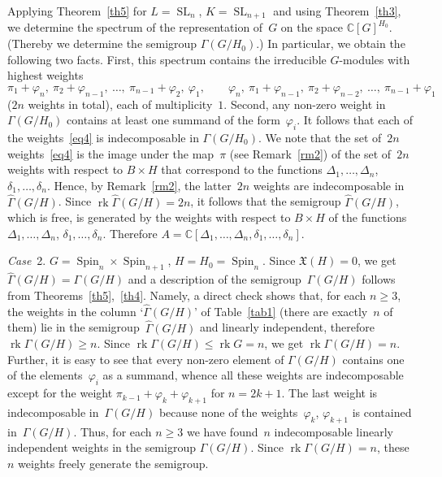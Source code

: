 \documentclass[12pt]{amsart}
\theoremstyle{definition}
\theoremstyle{remark}
\begin{document}
Applying Theorem~\ref{th5} for $L={\operatorname{SL}}_n$, $K={\operatorname{SL}}_{n+1}$ and using
Theorem~\ref{th3}, we determine the spectrum of the representation
of~$G$ on the space $\mathbb{C}[G]^{H_0}$. (Thereby we determine the
semigroup $\Gamma(G/H_0)$.) In particular, we obtain the following
two facts. First, this spectrum contains the irreducible $G$-modules
with highest weights
\begin{equation}
\label{eq4} \pi_1+\varphi_n,\ \pi_2+\varphi_{n-1},\ \dots,\
\pi_{n-1}+\varphi_2,\ \varphi_1, \qquad \varphi_n,\
\pi_1+\varphi_{n-1},\ \pi_2+\varphi_{n-2},\ \dots,\
\pi_{n-1}+\varphi_1
\end{equation}
($2n$ weights in total), each of multiplicity~$1$. Second, any
non-zero weight in $\Gamma(G/H_0)$ contains at least one summand of
the form~$\varphi_i$. It follows that each of the
weights~\eqref{eq4} is indecomposable in $\Gamma(G/H_0)$. We note
that the set of~$2n$ weights~\eqref{eq4} is the image under the
map~$\pi$ (see Remark~\ref{rm2}) of the set of~$2n$ weights with
respect to $B\times H$ that correspond to the functions
$\Delta_1,\dots,\Delta_n$, $\delta_1,\dots,\delta_n$. Hence, by
Remark~\ref{rm2}, the latter~$2n$ weights are indecomposable in
$\widehat\Gamma(G/H)$. Since ${\operatorname{rk}}\widehat\Gamma(G/H)=2n$, it follows
that the semigroup $\widehat\Gamma(G/H)$, which is free, is
generated by the weights with respect to $B\times H$ of the
functions $\Delta_1,\dots,\Delta_n$, $\delta_1,\dots,\delta_n$.
Therefore
$A=\mathbb{C}[\Delta_1,\dots,\Delta_n,\delta_1,\dots,\delta_n]$.

\textsl{Case}~2. $G={\operatorname{Spin}}_n \times {\operatorname{Spin}}_{n+1}$, $H=H_0={\operatorname{Spin}}_n$.
Since $\mathfrak{X}(H)=0$, we get $\widehat\Gamma(G/H)=\Gamma(G/H)$
and a description of the semigroup~$\Gamma(G/H)$ follows from
Theorems~\ref{th5},~\ref{th4}. Namely, a direct check shows that,
for each $n{\geqslant}3$, the weights in the column `$\widehat\Gamma(G/H)$'
of Table~\ref{tab1} (there are exactly~$n$ of them) lie in the
semigroup~$\widehat\Gamma(G/H)$ and linearly independent, therefore
${\operatorname{rk}} \Gamma(G/H){\geqslant} n$. Since ${\operatorname{rk}}\Gamma(G/H){\leqslant}{\operatorname{rk}} G=n$, we get
${\operatorname{rk}}\Gamma(G/H)=n$. Further, it is easy to see that every non-zero
element of $\Gamma(G/H)$ contains one of the elements~$\varphi_i$ as
a summand, whence all these weights are indecomposable except for
the weight $\pi_{k-1}+\varphi_k+\varphi_{k+1}$ for $n=2k+1$. The
last weight is indecomposable in~$\Gamma(G/H)$ because none of the
weights~$\varphi_k$, $\varphi_{k+1}$ is contained in~$\Gamma(G/H)$.
Thus, for each $n{\geqslant}3$ we have found~$n$ indecomposable linearly
independent weights in the semigroup $\Gamma(G/H)$. Since
${\operatorname{rk}}\Gamma(G/H)=n$, these~$n$ weights freely generate the semigroup.
\end{document}
